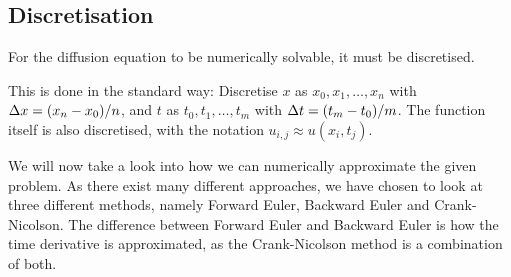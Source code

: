 \subsection{Discretisation}

For the diffusion equation to be numerically solvable, it must be discretised.

This is done in the standard way: Discretise \(x\) as \(x_0,x_1,\dots,x_n\) with \(\Delta x=\qty(x_n-x_0)/n\), and \(t\) as \(t_0,t_1,\dots,t_m\) with \(\Delta t = \qty(t_m-t_0)/m\). The function itself is also discretised, with the notation \(u_{i,j} \approx u(x_i,t_j)\).

We will now take a look into how we can numerically approximate the given problem. As there exist many different approaches, we have chosen to look at three different methods, namely Forward Euler, Backward Euler and Crank-Nicolson. The difference between Forward Euler and Backward Euler is how the time derivative is approximated, as the Crank-Nicolson method is a combination of both.
